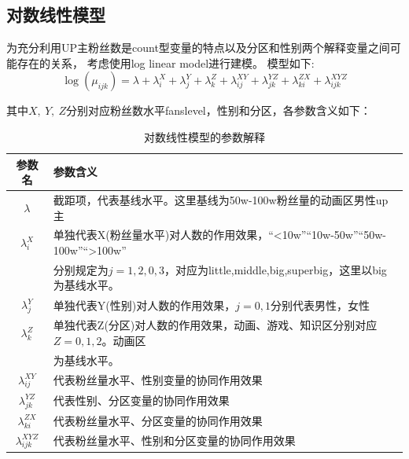\documentclass{ctexart}
\begin{document}
\subsection{对数线性模型}

为充分利用UP主粉丝数是count型变量的特点以及分区和性别两个解释变量之间可能存在的关系，
考虑使用log linear model进行建模。 模型如下:
\begin{equation}
    \log(\mu_{ijk})=\lambda+\lambda_i^X+\lambda_j^Y+\lambda_k^Z+\lambda_{ij}^{XY}
    +\lambda_{jk}^{YZ}+\lambda_{ki}^{ZX}+\lambda_{ijk}^{XYZ}
\end{equation}

其中$X,\ Y,\ Z$分别对应粉丝数水平fanslevel，性别和分区，各参数含义如下：

\begin{table}[H]
    \begin{tabular}{cl}
        \toprule
          参数名 & 参数含义  \\
        \midrule
          $\lambda$ & 截距项，代表基线水平。这里基线为50w-100w粉丝量的动画区男性up主 \\
          $\lambda_i^X$ & 单独代表X(粉丝量水平)对人数的作用效果，“<10w”“10w-50w”“50w-100w”“>100w”\\
                        & 分别规定为$j=1,2,0,3$，对应为little,middle,big,superbig，这里以big为基线水平。\\
          $\lambda_j^Y$ & 单独代表Y(性别)对人数的作用效果，$j=0,1$分别代表男性，女性\\
          $\lambda_k^Z$ & 单独代表Z(分区)对人数的作用效果，动画、游戏、知识区分别对应$Z=0,1,2$。动画区\\
                        & 为基线水平。\\
          $\lambda_{ij}^{XY}$ & 代表粉丝量水平、性别变量的协同作用效果\\
          $\lambda_{jk}^{YZ}$ & 代表性别、分区变量的协同作用效果\\
          $\lambda_{ki}^{ZX}$ & 代表粉丝量水平、分区变量的协同作用效果\\
          $\lambda_{ijk}^{XYZ}$ & 代表粉丝量水平、性别和分区变量的协同作用效果\\
        \bottomrule
     \end{tabular}
    \caption{对数线性模型的参数解释}
\end{table}
\end{document}
